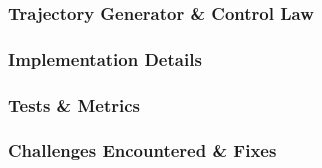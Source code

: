 \subsubsection{Trajectory Generator \& Control Law}
\subsubsection{Implementation Details}
\subsubsection{Tests \& Metrics}
\subsubsection{Challenges Encountered \& Fixes}